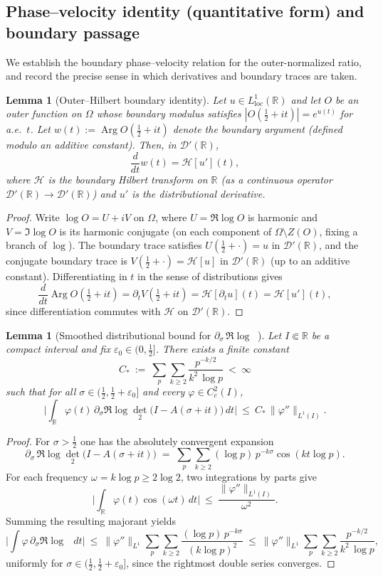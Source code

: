 \documentclass[11pt]{amsart}
\newtheorem{lemma}[theorem]{Lemma}
\theoremstyle{definition}
\theoremstyle{remark}
\newcommand{\R}{\mathbb{R}}
\newcommand{\Hilb}{\mathcal H}
\DeclareMathOperator{\dettwo}{det_2}
\DeclareMathOperator{\Arg}{Arg}
\begin{document}
\subsection{Phase--velocity identity (quantitative form) and boundary passage}

\label{app:phase-velocity}
We establish the boundary phase--velocity relation for the outer-normalized ratio, and record the precise sense in which derivatives and boundary traces are taken.
\begin{lemma}[Outer--Hilbert boundary identity]\label{lem:outer-phase-HT}
Let $u\in L^1_{\mathrm{loc}}(\mathbb R)$ and let $O$ be an outer function on $\Omega$ whose boundary modulus satisfies
$|O(\tfrac12+it)|=e^{u(t)}$ for a.e.\ $t$.
Let $w(t):=\Arg O(\tfrac12+it)$ denote the boundary argument (defined modulo an additive constant).
Then, in \(\mathcal D'(\mathbb R)\),
\[
  \frac{d}{dt}w(t)=\Hilb[u'](t),
\]
where \(\Hilb\) is the boundary Hilbert transform on \(\R\) (as a continuous operator \(\mathcal D'(\R)\to\mathcal D'(\R)\))
and \(u'\) is the distributional derivative.
\end{lemma}
\begin{proof}
Write \(\log O=U+iV\) on \(\Omega\), where \(U=\Re\log O\) is harmonic and \(V=\Im\log O\) is its harmonic conjugate
(on each component of \(\Omega\setminus Z(O)\), fixing a branch of \(\log\)).
The boundary trace satisfies \(U(\tfrac12+\cdot)=u\) in \(\mathcal D'(\R)\), and the conjugate boundary trace is
\(V(\tfrac12+\cdot)=\Hilb[u]\) in \(\mathcal D'(\R)\) (up to an additive constant).
Differentiating in \(t\) in the sense of distributions gives
\[
  \frac{d}{dt}\Arg O(\tfrac12+it)=\partial_t V(\tfrac12+it)=\Hilb[\partial_t u](t)=\Hilb[u'](t),
\]
since differentiation commutes with \(\Hilb\) on \(\mathcal D'(\R)\).
\end{proof}
\begin{lemma}[Smoothed distributional bound for \(\partial_\sigma\,\Re\log\dettwo\)]\label{lem:det2-unsmoothed}
Let \(I\Subset\R\) be a compact interval and fix \(\varepsilon_0\in(0,\tfrac12]\).
There exists a finite constant
\[
  C_*\ :=\ \sum_{p}\sum_{k\ge 2}\frac{p^{-k/2}}{k^2\,\log p}\ <\ \infty
\]
such that for all \(\sigma\in(\tfrac12,\tfrac12+\varepsilon_0]\) and every \(\varphi\in C_c^2(I)\),
\[
  \Big|\int_{\R} \varphi(t)\,\partial_\sigma\Re\log\det_2\!\big(I-A(\sigma+it)\big)\,dt\Big|\ \le\ C_*\,\|\varphi''\|_{L^1(I)}.
\]
\end{lemma}
\begin{proof}
For \(\sigma>\tfrac12\) one has the absolutely convergent expansion
\[
  \partial_\sigma\,\Re\log\det_2\!\big(I-A(\sigma+it)\big)
  \;=\; \sum_{p}\sum_{k\ge 2} (\log p)\,p^{-k\sigma}\cos(k t\log p).
\]
For each frequency \(\omega=k\log p\ge 2\log 2\), two integrations by parts give
\[
  \Big|\int_{\R}\!\varphi(t)\cos(\omega t)\,dt\Big|\ \le\ \frac{\|\varphi''\|_{L^1(I)}}{\omega^2}.
\]
Summing the resulting majorant yields
\[
  \Big|\int \varphi\,\partial_\sigma\Re\log\dettwo\,dt\Big|
  \ \le\ \|\varphi''\|_{L^1}\sum_{p}\sum_{k\ge 2}\frac{(\log p)\,p^{-k\sigma}}{(k\log p)^2}
  \ \le\ \|\varphi''\|_{L^1}\sum_{p}\sum_{k\ge 2}\frac{p^{-k/2}}{k^2\,\log p},
\]
uniformly for \(\sigma\in(\tfrac12,\tfrac12+\varepsilon_0]\), since the rightmost double series converges.
\end{proof}
\end{document}
